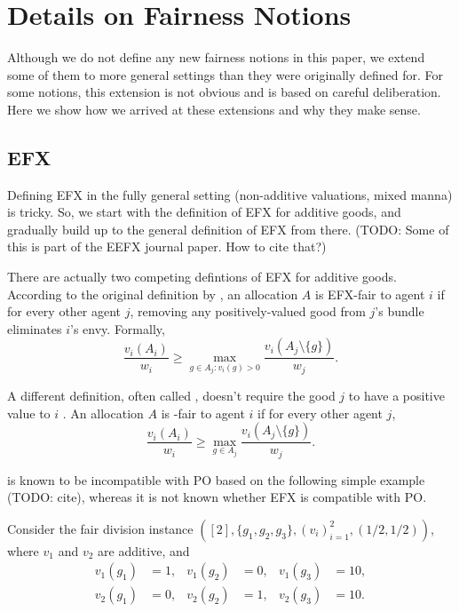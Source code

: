 \section{Details on Fairness Notions}
\label{sec:notions-extra}

Although we do not define any new fairness notions in this paper,
we extend some of them to more general settings than they were originally defined for.
For some notions, this extension is not obvious and is based on careful deliberation.
Here we show how we arrived at these extensions and why they make sense.

\subsection{EFX}
\label{sec:notions:efx}

Defining EFX in the fully general setting (non-additive valuations, mixed manna) is tricky.
So, we start with the definition of EFX for additive goods,
and gradually build up to the general definition of EFX from there.
(TODO: Some of this is part of the EEFX journal paper. How to cite that?)

There are actually two competing defintions of EFX for additive goods.
According to the original definition by \cite{caragiannis2019unreasonable},
an allocation $A$ is EFX-fair to agent $i$ if for every other agent $j$,
removing any positively-valued good from $j$'s bundle eliminates $i$'s envy. Formally,
\[ \frac{v_i(A_i)}{w_i} \ge \max_{g \in A_j: v_i(g) > 0} \frac{v_i(A_j \setminus \{g\})}{w_j}. \]

A different definition, often called \EFXZero{},
doesn't require the good $j$ to have a positive value to $i$ \cite{plaut2020almost}.
An allocation $A$ is \EFXZero-fair to agent $i$ if for every other agent $j$,
\[ \frac{v_i(A_i)}{w_i} \ge \max_{g \in A_j} \frac{v_i(A_j \setminus \{g\})}{w_j}. \]

\EFXZero{} is known to be incompatible with PO
based on the following simple example (TODO: cite),
whereas it is not known whether EFX is compatible with PO.

\begin{example}
\label{ex:efx-po}
Consider the fair division instance $([2], \{g_1, g_2, g_3\}, (v_i)_{i=1}^2, (1/2, 1/2))$,
where $v_1$ and $v_2$ are additive, and
\begin{align*}
   v_1(g_1) &= 1, & v_1(g_2) &= 0, & v_1(g_3) &= 10,
\\ v_2(g_1) &= 0, & v_2(g_2) &= 1, & v_2(g_3) &= 10.
\end{align*}
\end{example}

